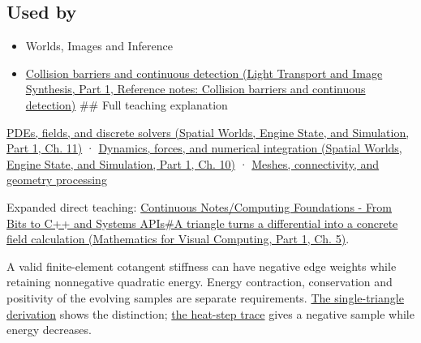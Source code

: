 \subsection{Used by}\label{appendix-1988d465c119-used-by}

\hypertarget{appendix-1988d465c119-used-by}{}

\begin{itemize}
\item
  {Worlds, Images and Inference}
\item
  \href{../04-Light-Transport-and-Image-Synthesis-P01/main.pdf\#nameddest=appendix-a9ba01fa72a6}{Collision barriers and continuous detection (Light Transport and Image Synthesis, Part 1, Reference notes: Collision barriers and continuous detection)} \#\# Full teaching explanation
\end{itemize}

\href{../05-Spatial-Worlds-Engine-State-and-Simulation-P01/main.pdf\#nameddest=04-visual-computing-ii-ch030-pdes-fields-and-discrete-solvers}{PDEs, fields, and discrete solvers (Spatial Worlds, Engine State, and Simulation, Part 1, Ch. 11)} · \href{../05-Spatial-Worlds-Engine-State-and-Simulation-P01/main.pdf\#nameddest=04-visual-computing-ii-ch029-dynamics-forces-and-numerical-integration}{Dynamics, forces, and numerical integration (Spatial Worlds, Engine State, and Simulation, Part 1, Ch. 10)} · \hyperref[03-visual-computing-i-ch002-meshes-connectivity-and-geometry-processing]{Meshes, connectivity, and geometry processing}

Expanded direct teaching: \href{../02-Mathematics-for-Visual-Computing-P01/main.pdf\#nameddest=02-foundations-ii-ch021-a-triangle-turns-a-differential-into-a-concrete-field-calculation}{Continuous Notes/Computing Foundations - From Bits to C++ and Systems APIs\#A triangle turns a differential into a concrete field calculation (Mathematics for Visual Computing, Part 1, Ch. 5)}.

A valid finite-element cotangent stiffness can have negative edge weights while retaining nonnegative quadratic energy. Energy contraction, conservation and positivity of the evolving samples are separate requirements. \hyperref[03-visual-computing-i-ch002-nonnegative-energy-and-nonnegative-weights-are-different-promises]{The single-triangle derivation} shows the distinction; \hyperref[03-visual-computing-i-ch002-a-stable-heat-step-can-still-create-a-negative-sample]{the heat-step trace} gives a negative sample while energy decreases.
